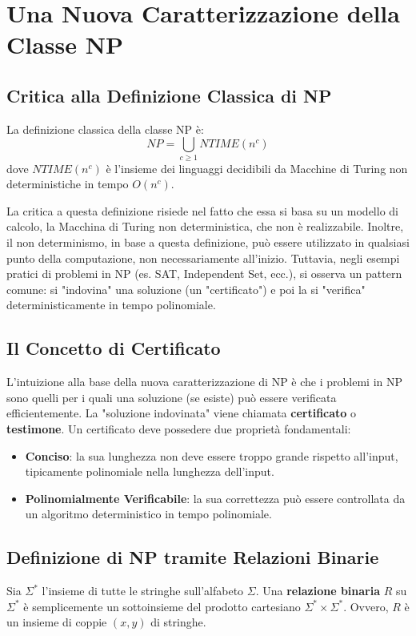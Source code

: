 \documentclass[a4paper, 11pt]{book} %
\theoremstyle{definition}
\begin{document}
\section{Una Nuova Caratterizzazione della Classe NP}

\subsection{Critica alla Definizione Classica di NP}
La definizione classica della classe NP è:
\[ NP = \bigcup_{c \ge 1} NTIME(n^c) \]
dove $NTIME(n^c)$ è l'insieme dei linguaggi decidibili da Macchine di Turing non deterministiche in tempo $O(n^c)$.

La critica a questa definizione risiede nel fatto che essa si basa su un modello di calcolo, la Macchina di Turing non deterministica, che non è realizzabile. Inoltre, il non determinismo, in base a questa definizione, può essere utilizzato in qualsiasi punto della computazione, non necessariamente all'inizio. Tuttavia, negli esempi pratici di problemi in NP (es. SAT, Independent Set, ecc.), si osserva un pattern comune: si "indovina" una soluzione (un "certificato") e poi la si "verifica" deterministicamente in tempo polinomiale.

\subsection{Il Concetto di Certificato}
L'intuizione alla base della nuova caratterizzazione di NP è che i problemi in NP sono quelli per i quali una soluzione (se esiste) può essere verificata efficientemente. La "soluzione indovinata" viene chiamata \textbf{certificato} o \textbf{testimone}.
Un certificato deve possedere due proprietà fondamentali:
\begin{itemize}
    \item \textbf{Conciso}: la sua lunghezza non deve essere troppo grande rispetto all'input, tipicamente polinomiale nella lunghezza dell'input.
    \item \textbf{Polinomialmente Verificabile}: la sua correttezza può essere controllata da un algoritmo deterministico in tempo polinomiale.
\end{itemize}

\subsection{Definizione di NP tramite Relazioni Binarie}

Sia $\Sigma^*$ l'insieme di tutte le stringhe sull'alfabeto $\Sigma$. Una \textbf{relazione binaria} $R$ su $\Sigma^*$ è semplicemente un sottoinsieme del prodotto cartesiano $\Sigma^* \times \Sigma^*$. Ovvero, $R$ è un insieme di coppie $(x, y)$ di stringhe.
\end{document}

